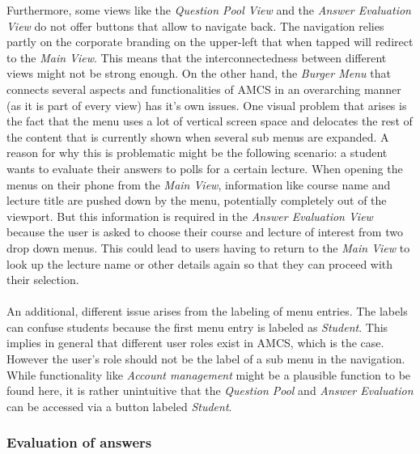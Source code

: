 Furthermore, some views like the \emph{Question Pool View} and the \emph{Answer Evaluation View} do not offer buttons that allow to navigate back. The navigation relies partly on the corporate branding on the upper-left that when tapped will redirect to the \emph{Main View}.
This means that the interconnectedness between different views might not be strong enough.
\newline
\newline
On the other hand, the \emph{Burger Menu} that connects several aspects and functionalities of AMCS in an overarching manner (as it is part of every view) has it's own issues. 
One visual problem that arises is the fact that the menu uses a lot of vertical screen space and delocates the rest of the content that is currently shown when several sub menus are expanded. A reason for why this is problematic might be the following scenario: a student wants to evaluate their answers to polls for a certain lecture. When opening the menus on their phone from the \emph{Main View}, information like course name and lecture title are pushed down by the menu, potentially completely out of the viewport. But this information is required in the \emph{Answer Evaluation View} because the user is asked to choose their course and lecture of interest from two drop down menus. This could lead to users having to return to the \emph{Main View} to look up the lecture name or other details again so that they can proceed with their selection.
\\
\\
An additional, different issue arises from the labeling of menu entries. The labels can confuse students because the first menu entry is labeled as \emph{Student}. This implies in general that different user roles exist in AMCS, which is the case. However the user's role should not be the label of a sub menu in the navigation. While functionality like \emph{Account management} might be a plausible function to be found here, it is rather unintuitive that the \emph{Question Pool} and \emph{Answer Evaluation} can be accessed via a button labeled \emph{Student}.

\subsubsection{Evaluation of answers}

